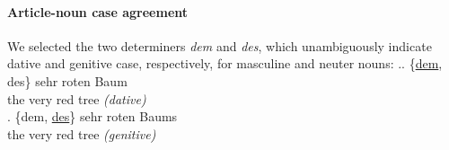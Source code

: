 

\paragraph{Article-noun case agreement}
We selected the two determiners \emph{dem} and \emph{des}, which
unambiguously indicate dative and genitive case, respectively, for
masculine and neuter nouns: %
\ex.\ag. {\{\underline{dem}, des\}} sehr roten Baum \\
the very red {tree \emph{(dative)}} \\
\bg. {\{dem, \underline{des}\}} sehr roten Baums \\
the very red {tree \emph{(genitive)}} \\



%

